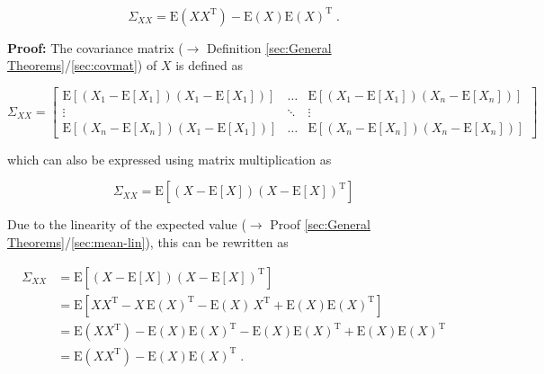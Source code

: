 \documentclass[a4paper,12pt,twoside]{book}
\begin{document}
\begin{equation} \label{eq:covmat-mean-covmat-mean}
\Sigma_{XX} = \mathrm{E}(X X^\mathrm{T}) - \mathrm{E}(X) \mathrm{E}(X)^\mathrm{T} \; .
\end{equation}


\vspace{1em}
\textbf{Proof:} The covariance matrix ($\rightarrow$ Definition \ref{sec:General Theorems}/\ref{sec:covmat}) of $X$ is defined as

\begin{equation} \label{eq:covmat-mean-covmat1}
\Sigma_{XX} =
\begin{bmatrix}
\mathrm{E}\left[ (X_1-\mathrm{E}[X_1]) (X_1-\mathrm{E}[X_1]) \right] & \ldots & \mathrm{E}\left[ (X_1-\mathrm{E}[X_1]) (X_n-\mathrm{E}[X_n]) \right] \\
\vdots & \ddots & \vdots \\
\mathrm{E}\left[ (X_n-\mathrm{E}[X_n]) (X_1-\mathrm{E}[X_1]) \right] & \ldots & \mathrm{E}\left[ (X_n-\mathrm{E}[X_n]) (X_n-\mathrm{E}[X_n]) \right]
\end{bmatrix}
\end{equation}

which can also be expressed using matrix multiplication as

\begin{equation} \label{eq:covmat-mean-covmat2}
\Sigma_{XX} = \mathrm{E}\left[ (X-\mathrm{E}[X]) (X-\mathrm{E}[X])^\mathrm{T} \right]
\end{equation}

Due to the linearity of the expected value ($\rightarrow$ Proof \ref{sec:General Theorems}/\ref{sec:mean-lin}), this can be rewritten as

\begin{equation} \label{eq:covmat-mean-covmat-mean-qed}
\begin{split}
\Sigma_{XX} &= \mathrm{E}\left[ (X-\mathrm{E}[X]) (X-\mathrm{E}[X])^\mathrm{T} \right] \\
&= \mathrm{E}\left[ X X^\mathrm{T} - X \, \mathrm{E}(X)^\mathrm{T} - \mathrm{E}(X) \, X^\mathrm{T} + \mathrm{E}(X) \mathrm{E}(X)^\mathrm{T} \right] \\
&= \mathrm{E}(X X^\mathrm{T}) - \mathrm{E}(X) \mathrm{E}(X)^\mathrm{T} - \mathrm{E}(X) \mathrm{E}(X)^\mathrm{T} + \mathrm{E}(X) \mathrm{E}(X)^\mathrm{T} \\
&= \mathrm{E}(X X^\mathrm{T}) - \mathrm{E}(X) \mathrm{E}(X)^\mathrm{T} \; .
\end{split}
\end{equation}
\end{document}
